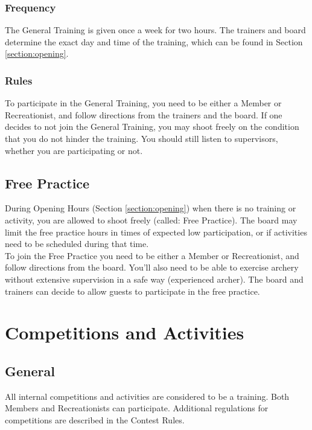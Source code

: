 \documentclass[a4paper]{article}
\newcommand{\Awr}{Contest Rules} %
\begin{document}
\subsubsection{Frequency}
The { General Training} is given once a week for two hours. The trainers and board determine the exact day and time of the training, which can be found in Section \ref{section:opening}.

\subsubsection{Rules}
To participate in the { General Training}, you need to be either a { Member} or { Recreationist}, and follow directions from the trainers and the board. If one decides to not join the { General Training}, you may shoot freely on the condition that you do not hinder the training. You should still listen to { supervisors}, whether you are participating or not.

\subsection{Free Practice}
During Opening Hours (Section \ref{section:opening}) when there is no training or activity, you are allowed to shoot freely (called: Free Practice). The board may limit the free practice hours in times of expected low participation, or if activities need to be scheduled during that time. \\

To join the Free Practice you need to be either a { Member} or { Recreationist}, and follow directions from the board. You'll also need to be able to exercise archery without extensive supervision in a safe way ({ experienced} { archer}). The board and trainers can decide to allow { guests} to participate in the free practice.

\section{Competitions and Activities}
\subsection{General}
All internal competitions and activities are considered to be a training. Both { Members} and { Recreationists} can participate. Additional regulations for competitions are described in the { \Awr}.
\end{document}
